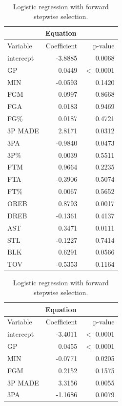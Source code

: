\begin{table}[H]
	\begin{subtable}[h]{0.3\textwidth}
		\centering
		\begin{tabular}{|| l | r | r ||} 
			\hline
			\multicolumn{3}{|c|}{Equation} \\
			\hline
			Variable & Coefficient & p-value \\
			\hline
			intercept & -3.8885 & 0.0068 \\
			GP & 0.0449 & $<$ 0.0001 \\
			MIN & -0.0593 & 0.1420 \\
			FGM & 0.0997 & 0.8668 \\
			FGA & 0.0183 & 0.9469 \\
			FG\% & 0.0187 & 0.4721 \\
			3P MADE & 2.8171 & 0.0312 \\
			3PA & -0.9840 & 0.0473 \\
			3P\% & 0.0039 & 0.5511 \\
			FTM & 0.9664 & 0.2235 \\
			FTA & -0.3906 & 0.5074 \\
			FT\% & 0.0067 & 0.5652 \\
			OREB & 0.8793 & 0.0017 \\
			DREB & -0.1361 & 0.4137 \\
			AST & 0.3471 & 0.0111 \\
			STL & -0.1227 & 0.7414 \\
			BLK & 0.6291 & 0.0566 \\				
			TOV & -0.5353 & 0.1164 \\		
			\hline
		\end{tabular}
		\caption{Logistic regression with forward stepwise selection.}
		\label{table:LRFSSSum}
	\end{subtable}
	\hfill
	\begin{subtable}[h]{0.3\textwidth}
		\centering
		\begin{tabular}{|| l | r | r ||} 
			\hline
			\multicolumn{3}{|c|}{Equation} \\
			\hline
			Variable & Coefficient & p-value \\
			\hline
			intercept & -3.4011 & $<$ 0.0001 \\
			GP & 0.0455 & $<$ 0.0001 \\
			MIN & -0.0771 & 0.0205 \\
			FGM & 0.2152 & 0.1575 \\
			3P MADE & 3.3156 & 0.0055 \\
			3PA & -1.1686 & 0.0079 \\

\end{tabular}
\end{subtable}
\end{table}

